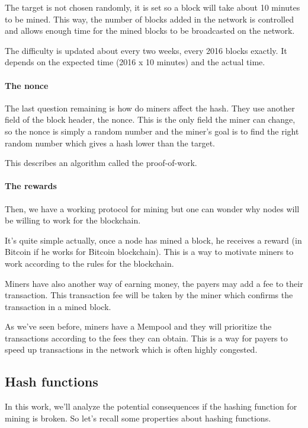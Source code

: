 The target is not chosen randomly, it is set so a block will take about 10 minutes to be mined. This way, the number of blocks added in the network is controlled and allows enough time for the mined blocks to be broadcasted on the network.

The difficulty is updated about every two weeks, every 2016 blocks exactly. It depends on the expected time (2016 x 10 minutes) and the actual time.

  \paragraph{The nonce}

The last question remaining is how do miners affect the hash. They use another field of the block header, the nonce. This is the only field the miner can change, so the nonce is simply a random number and the miner's goal is to find the right random number which gives a hash lower than the target. \newline

This describes an algorithm called the proof-of-work.

  \paragraph{The rewards}

Then, we have a working protocol for mining but one can wonder why nodes will be willing to work for the blockchain.

It's quite simple actually, once a node has mined a block, he receives a reward (in Bitcoin if he works for Bitcoin blockchain). This is a way to motivate miners to work according to the rules for the blockchain. \newline

Miners have also another way of earning money, the payers may add a fee to their transaction. This transaction fee will be taken by the miner which confirms the transaction in a mined block.

As we've seen before, miners have a Mempool and they will prioritize the transactions according to the fees they can obtain. This is a way for payers to speed up transactions in the network which is often highly congested.


  \subsection{Hash functions}

In this work, we'll analyze the potential consequences if the hashing function for mining is broken. So let's recall some properties about hashing functions. \newline


